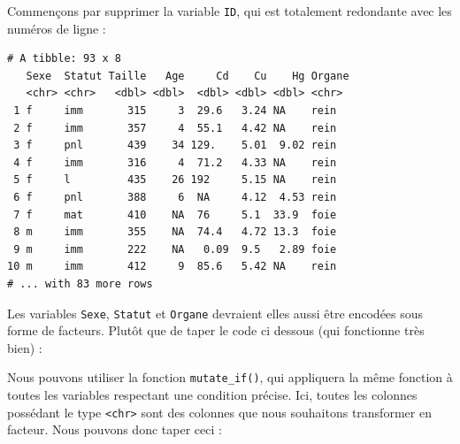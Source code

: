 \documentclass[a4paperpaper,]{article}
\newenvironment{Shaded}{\begin{snugshade}}{\end{snugshade}}
\newcommand{\DataTypeTok}[1]{\textcolor[rgb]{0.00,0.34,0.68}{#1}}
\newcommand{\KeywordTok}[1]{\textcolor[rgb]{0.12,0.11,0.11}{\textbf{#1}}}
\newcommand{\NormalTok}[1]{\textcolor[rgb]{0.12,0.11,0.11}{#1}}
\newcommand{\OperatorTok}[1]{\textcolor[rgb]{0.12,0.11,0.11}{#1}}
\newcommand{\StringTok}[1]{\textcolor[rgb]{0.75,0.01,0.01}{#1}}
\begin{document}
Commençons par supprimer la variable \texttt{ID}, qui est totalement redondante avec les numéros de ligne :

\begin{Shaded}
\end{Shaded}

\begin{verbatim}
# A tibble: 93 x 8
   Sexe  Statut Taille   Age     Cd    Cu    Hg Organe
   <chr> <chr>   <dbl> <dbl>  <dbl> <dbl> <dbl> <chr> 
 1 f     imm       315     3  29.6   3.24 NA    rein  
 2 f     imm       357     4  55.1   4.42 NA    rein  
 3 f     pnl       439    34 129.    5.01  9.02 rein  
 4 f     imm       316     4  71.2   4.33 NA    rein  
 5 f     l         435    26 192     5.15 NA    rein  
 6 f     pnl       388     6  NA     4.12  4.53 rein  
 7 f     mat       410    NA  76     5.1  33.9  foie  
 8 m     imm       355    NA  74.4   4.72 13.3  foie  
 9 m     imm       222    NA   0.09  9.5   2.89 foie  
10 m     imm       412     9  85.6   5.42 NA    rein  
# ... with 83 more rows
\end{verbatim}

Les variables \texttt{Sexe}, \texttt{Statut} et \texttt{Organe} devraient elles aussi être encodées sous forme de facteurs. Plutôt que de taper le code ci dessous (qui fonctionne très bien) :

\begin{Shaded}
\end{Shaded}

Nous pouvons utiliser la fonction \texttt{mutate\_if()}, qui appliquera la même fonction à toutes les variables respectant une condition précise. Ici, toutes les colonnes possédant le type \texttt{\textless{}chr\textgreater{}} sont des colonnes que nous souhaitons transformer en facteur. Nous pouvons donc taper ceci :
\end{document}
